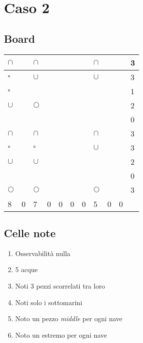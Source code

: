 \documentclass[11pt]{article}
\begin{document}
\section{Caso 2}
\subsection{Board}
\begin{table}[H]
    \begin{tabular}{|l|l|l|l|l|l|l|l|l|l||l|}
    \hline
     $\cap$ &  & $\cap$ &  &  &  &  & $\cap$ &  &  & 3 \\ \hline
     $\square$ &  & $\cup$ &  &  &  &  & $\cup$ &  &  & 3 \\ \hline
     $\square$ &  &  &  &  &  &  &  &  &  & 1 \\ \hline
     $\cup$ &  & $\Circle$ &  &  &  &  &  &  &  & 2 \\ \hline
     &  &  &  &  &  &  &  &  &  & 0 \\ \hline
     $\cap$ &  & $\cap$ &  &  &  &  & $\cap$ &  &  & 3 \\ \hline
     $\square$ &  & $\square$ &  &  &  &  & $\cup$ &  &  & 3 \\ \hline
     $\cup$ &  & $\cup$ &  &  &  &  &  &  &  & 2 \\ \hline
     &  &  &  &  &  &  &  &  &  & 0 \\ \hline
     $\Circle$ &  & $\Circle$ &  &  &  &  & $\Circle$ &  &  & 3 \\ \hline \hline
     8 & 0 & 7 & 0 & 0 & 0 & 0 & 5 & 0 & 0 & \\ \hline
    \end{tabular}
\end{table}

\subsection{Celle note}
\begin{enumerate}
    \item Osservabilità nulla
    \item 5 acque 
    \item Noti 3 pezzi scorrelati tra loro
    \item Noti solo i sottomarini
    \item Noto un pezzo \emph{middle} per ogni nave
    \item Noto un estremo per ogni nave
\end{enumerate}
\end{document}

